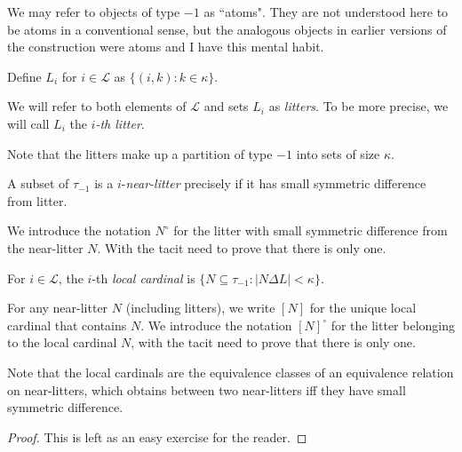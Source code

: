 We may refer to objects of type $-1$ as ``atoms".  They are not understood here to be atoms in a conventional sense, but the analogous objects in earlier versions of the construction were atoms and I have this mental habit.

\begin{definition}
\label {def:litter}
\leanok
{}
Define $L_i$ for $i \in \mathcal L$ as $\{(i, k) : k \in \kappa\}$.

We will refer to both elements of $\mathcal L$ and sets $L_i$ as {\em litters}. To be more precise,
we will call $L_i$ the {\em $i$-th litter}.

Note that the litters make up a partition of type $-1$ into sets of size $\kappa$.
\end{definition}

\begin{definition}
\label {def:near-litter}
\leanok
{}
A subset of $\tau_{-1}$ is a $i$-{\em near-litter} precisely if it has small symmetric difference from  litter.

We introduce the notation $N^\circ$ for the litter with small symmetric difference from the near-litter $N$.
With the tacit need to prove that there is only one.
\end{definition}

\begin{definition}
\label {def:local-cardinal}
For $i \in \mathcal L$, the $i$-th {\em local cardinal} is $\{N \subseteq \tau_{-1}:|N \Delta L|<\kappa\}$.

For any near-litter $N$ (including litters), we write $[N]$ for the unique local cardinal that contains $N$. We introduce the notation $[N]^\circ$ for the litter belonging to the local cardinal $N$, with the tacit need to prove that there is only one.
\end{definition}

\begin{lemma}
\label {lem:small-diff-equiv}
\leanok
{}
Note that the local cardinals are the equivalence classes of an equivalence relation on near-litters, which obtains between two near-litters iff they have small symmetric difference.
\end{lemma}

\begin{proof}
\leanok
This is left as an easy exercise for the reader.
\end{proof}

